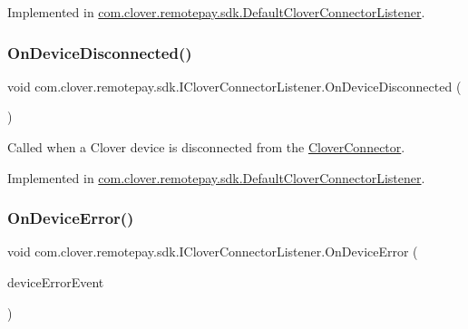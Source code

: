 Implemented in \hyperlink{classcom_1_1clover_1_1remotepay_1_1sdk_1_1_default_clover_connector_listener_a0cddc2718e6895d057bebd5f3478f105}{com.\+clover.\+remotepay.\+sdk.\+Default\+Clover\+Connector\+Listener}.

\mbox{\label{interfacecom_1_1clover_1_1remotepay_1_1sdk_1_1_i_clover_connector_listener_abd56956db2761cb9cfcd2af83647bb8f}} 
\subsubsection{\texorpdfstring{On\+Device\+Disconnected()}{OnDeviceDisconnected()}}
{\footnotesize\ttfamily void com.\+clover.\+remotepay.\+sdk.\+I\+Clover\+Connector\+Listener.\+On\+Device\+Disconnected (\begin{DoxyParamCaption}{ }\end{DoxyParamCaption})}



Called when a Clover device is disconnected from the \hyperlink{classcom_1_1clover_1_1remotepay_1_1sdk_1_1_clover_connector}{Clover\+Connector}. 



Implemented in \hyperlink{classcom_1_1clover_1_1remotepay_1_1sdk_1_1_default_clover_connector_listener_a2768c7875db334d7615cfac32b8a9115}{com.\+clover.\+remotepay.\+sdk.\+Default\+Clover\+Connector\+Listener}.

\mbox{\label{interfacecom_1_1clover_1_1remotepay_1_1sdk_1_1_i_clover_connector_listener_ab342b91dab98cd7ee976973315251291}} 
\subsubsection{\texorpdfstring{On\+Device\+Error()}{OnDeviceError()}}
{\footnotesize\ttfamily void com.\+clover.\+remotepay.\+sdk.\+I\+Clover\+Connector\+Listener.\+On\+Device\+Error (\begin{DoxyParamCaption}\item[{\hyperlink{classcom_1_1clover_1_1remotepay_1_1sdk_1_1_clover_device_error_event}{Clover\+Device\+Error\+Event}}]{device\+Error\+Event }\end{DoxyParamCaption})}



